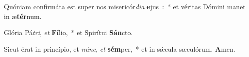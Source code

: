 ﻿\item Quóniam confirmáta est super nos misericór\emph{di}\emph{a} \textbf{e}jus~:~* et véritas Dómini manet in æ\textbf{tér}num.
\item Glória Pá\emph{tri}, \emph{et} \textbf{Fí}lio,~* et Spirítui \textbf{Sán}cto.
\item Sicut érat in princípio, et \emph{núnc}, \emph{et} \textbf{sém}per,~* et in sǽcula sæculórum. \textbf{A}men.